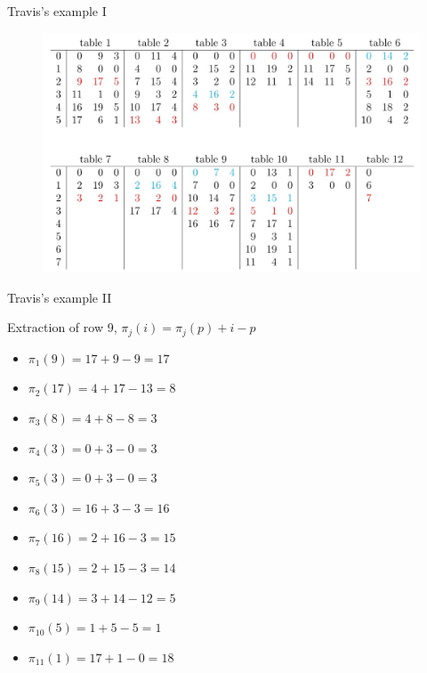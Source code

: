\documentclass{beamer}
\begin{document}
\begin{frame}{Travis's example I}
  \begin{figure}[H]
    \centering
    \includegraphics[scale = 0.22]{img/trick2.jpg}
  \end{figure}
\end{frame}
\begin{frame}{Travis's example II}
  \begin{block}{Extraction of row 9, $\pi_j(i)=\pi_j(p)+i-p$}
    \begin{multicols}{2}
      \begin{itemize}
        \item $\pi_1(9)=17+9-9=17$
        \item $\pi_2(17)=4+17-13=8$
        \item $\pi_3(8)=4+8-8=3$
        \item $\pi_4(3)=0+3-0=3$
        \item $\pi_5(3)=0+3-0=3$
        \item $\pi_6(3)=16+3-3=16$

        \item $\pi_7(16)=2+16-3=15$
        \item $\pi_8(15)=2+15-3=14$
        \item $\pi_9(14)=3+14-12=5$
        \item $\pi_{10}(5)=1+5-5=1$
        \item $\pi_{11}(1)=17+1-0=18$
      \end{itemize}
    \end{multicols}
  \end{block}
\end{frame}
\end{document}
